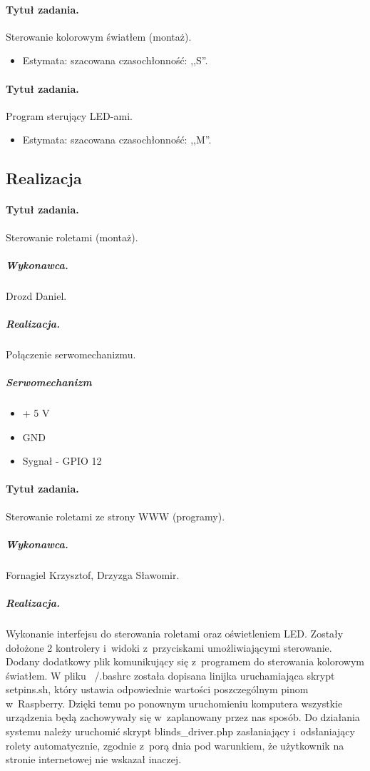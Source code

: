 \paragraph{Tytuł zadania.} Sterowanie kolorowym światłem (montaż).
\begin{itemize}
	\item Estymata: szacowana czasochłonność: ,,S''.
\end{itemize}

\paragraph{Tytuł zadania.} Program sterujący LED-ami.
\begin{itemize}
	\item Estymata: szacowana czasochłonność: ,,M''.
\end{itemize}


\subsection{Realizacja}

\paragraph{Tytuł zadania.} Sterowanie roletami (montaż).
\subparagraph{Wykonawca.} Drozd Daniel.
\subparagraph{Realizacja.} Połączenie serwomechanizmu.
\subparagraph{Serwomechanizm}

\begin{itemize}
	\item + 5 V
	\item GND
	\item Sygnał - GPIO 12
\end{itemize}
\paragraph{Tytuł zadania.} Sterowanie roletami ze strony WWW (programy).
\subparagraph{Wykonawca.} Fornagiel Krzysztof, Drzyzga Sławomir.
\subparagraph{Realizacja.} Wykonanie interfejsu do sterowania roletami oraz oświetleniem LED. Zostały dołożone 2 kontrolery i~widoki z~przyciskami umożliwiającymi sterowanie. Dodany dodatkowy plik komunikujący się z~programem do sterowania kolorowym światłem. W pliku ~/.bashrc została dopisana linijka uruchamiająca skrypt setpins.sh, który ustawia odpowiednie wartości poszczególnym pinom w~Raspberry. Dzięki temu po ponownym uruchomieniu komputera wszystkie urządzenia będą zachowywały się w~zaplanowany przez nas sposób. Do działania systemu należy uruchomić skrypt blinds\_driver.php zasłaniający i~odsłaniający rolety automatycznie, zgodnie z~porą dnia pod warunkiem, że użytkownik na stronie internetowej nie wskazał inaczej.
